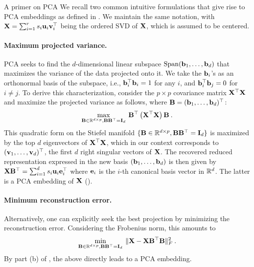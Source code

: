 \begin{mem1}{A primer on PCA}\label{memo:PCA}
	We recall two common intuitive formulations that give rise to PCA embeddings as defined in . We maintain the same notation, with ${\mathbf{X}} = \sum_{i=1}^{r} s_i {\mathbf{u}}_i {\mathbf{v}}_i^\top$ being the ordered SVD of ${\mathbf{X}}$, which is assumed to be centered.

	\paragraph{Maximum projected variance.} PCA seeks to find the $d$-dimensional linear subspace $\mathrm{Span}({\mathbf{b}}_1, \dots, {\mathbf{b}}_d)$ that maximizes the variance of the data projected onto it. We take the ${\mathbf{b}}_i$'s as an orthonormal basis of the subspace, i.e., ${\mathbf{b}}_i^\top {\mathbf{b}}_i = 1$ for any $i$, and ${\mathbf{b}}_i^\top {\mathbf{b}}_j = 0$ for $i \neq j$. 
	To derive this characterization, consider the $p \times p$ covariance matrix ${\mathbf{X}}^\top {\mathbf{X}}$ and maximize the projected variance as follows, where ${\mathbf{B}} = ({\mathbf{b}}_1, \dots, {\mathbf{b}}_d)^\top$:
	\begin{align}
	\max_{{\mathbf{B}} \in \mathbb{R}^{d \times p}, {\mathbf{B}} {\mathbf{B}}^\top = {\mathbf{I}}_d} \: {\mathbf{B}}^\top \left({\mathbf{X}}^\top {\mathbf{X}}\right) {\mathbf{B}} \:.
	\end{align}
	This quadratic form on the Stiefel manifold $\{{\mathbf{B}} \in \mathbb{R}^{d \times p}, {\mathbf{B}} {\mathbf{B}}^\top = {\mathbf{I}}_d \}$ is maximized by the top $d$ eigenvectors of ${\mathbf{X}}^\top {\mathbf{X}}$, which in our context corresponds to $({\mathbf{v}}_1, \dots, {\mathbf{v}}_d)^\top$, the first $d$ right singular vectors of ${\mathbf{X}}$. The recovered reduced representation expressed in the new basis $({\mathbf{b}}_1, \dots, {\mathbf{b}}_d)$ is then given by
	$
	{\mathbf{X}} {\mathbf{B}}^\top = \sum_{i=1}^{d} s_i {\mathbf{u}}_i {\mathbf{e}}_i^\top
	$
	where ${\mathbf{e}}_i$ is the $i$-th canonical basis vector in $\mathbb{R}^d$. The latter is a PCA embedding of ${\mathbf{X}}$ ().

	\paragraph{Minimum reconstruction error.} Alternatively, one can explicitly seek the best projection by minimizing the reconstruction error. Considering the Frobenius norm, this amounts to 
	\begin{align}
	\min_{{\mathbf{B}} \in \mathbb{R}^{d \times p}, {\mathbf{B}} {\mathbf{B}}^\top = {\mathbf{I}}_d} \: \| {\mathbf{X}} - {\mathbf{X}} {\mathbf{B}}^\top {\mathbf{B}} \|_F^2 \:.
	\end{align}
	By part (b) of , the above directly leads to a PCA embedding.

\end{mem1}


